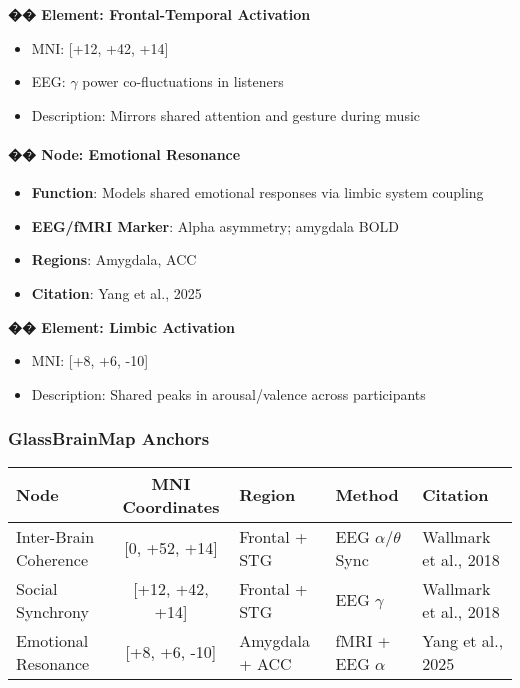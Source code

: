 \textbf{�� Element: Frontal-Temporal Activation}

\begin{itemize}
    \item MNI: [+12, +42, +14]
    \item EEG: $\gamma$ power co-fluctuations in listeners
    \item Description: Mirrors shared attention and gesture during music
\end{itemize}

\paragraph{�� Node: Emotional Resonance}

\begin{itemize}
    \item \textbf{Function}: Models shared emotional responses via limbic system coupling
    \item \textbf{EEG/fMRI Marker}: Alpha asymmetry; amygdala BOLD
    \item \textbf{Regions}: Amygdala, ACC
    \item \textbf{Citation}: Yang et al., 2025
\end{itemize}

\textbf{�� Element: Limbic Activation}

\begin{itemize}
    \item MNI: [+8, +6, -10]
    \item Description: Shared peaks in arousal/valence across participants
\end{itemize}

\subsubsection*{GlassBrainMap Anchors}

\begin{center}
\begin{tabular}{|l|c|l|l|l|}
\hline
\textbf{Node} & \textbf{MNI Coordinates} & \textbf{Region} & \textbf{Method} & \textbf{Citation} \\
\hline
Inter-Brain Coherence & [0, +52, +14] & Frontal + STG & EEG $\alpha$/$\theta$ Sync & Wallmark et al., 2018 \\
Social Synchrony & [+12, +42, +14] & Frontal + STG & EEG $\gamma$ & Wallmark et al., 2018 \\
Emotional Resonance & [+8, +6, -10] & Amygdala + ACC & fMRI + EEG $\alpha$ & Yang et al., 2025 \\
\hline
\end{tabular}
\end{center}

